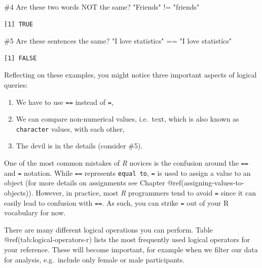 \documentclass[
  letterpaper,
]{krantz}
\makeatletter
\newenvironment{Shaded}{\begin{snugshade}}{\end{snugshade}}
\newcommand{\CommentTok}[1]{\textcolor[rgb]{0.37,0.37,0.37}{#1}}
\newcommand{\SpecialCharTok}[1]{\textcolor[rgb]{0.37,0.37,0.37}{#1}}
\newcommand{\StringTok}[1]{\textcolor[rgb]{0.13,0.47,0.30}{#1}}
\providecommand{\tightlist}{%
  \setlength{\itemsep}{0pt}\setlength{\parskip}{0pt}}\usepackage{longtable,booktabs,array}
\newenvironment{kframe}{%
\medskip{}
\setlength{\fboxsep}{.8em}
 \def\at@end@of@kframe{}%
 \ifinner\ifhmode%
  \def\at@end@of@kframe{\end{minipage}}%
  \begin{minipage}{\columnwidth}%
 \fi\fi%
 \def\FrameCommand##1{\hskip\@totalleftmargin \hskip-\fboxsep
 \colorbox{shadecolor}{##1}\hskip-\fboxsep
     \hskip-\linewidth \hskip-\@totalleftmargin \hskip\columnwidth}%
 \MakeFramed {\advance\hsize-\width
   \@totalleftmargin\z@ \linewidth\hsize
   \@setminipage}}%
 {\par\unskip\endMakeFramed%
 \at@end@of@kframe}
\renewenvironment{Shaded}{\begin{kframe}}{\end{kframe}}
\makeatother
\begin{document}
\begin{Shaded}
\begin{Highlighting}[]
\CommentTok{\#4 Are these two words NOT the same?}
\StringTok{"Friends"} \SpecialCharTok{!=} \StringTok{"friends"}
\end{Highlighting}
\end{Shaded}

\begin{verbatim}
[1] TRUE
\end{verbatim}

\begin{Shaded}
\begin{Highlighting}[]
\CommentTok{\#5 Are these sentences the same?}
\StringTok{"I love statistics"} \SpecialCharTok{==} \StringTok{"I love statistícs"}
\end{Highlighting}
\end{Shaded}

\begin{verbatim}
[1] FALSE
\end{verbatim}

Reflecting on these examples, you might notice three important aspects
of logical queries:

\begin{enumerate}
\def\labelenumi{\arabic{enumi}.}
\tightlist
\item
  We have to use \texttt{==} instead of \texttt{=},
\item
  We can compare non-numerical values, i.e.~text, which is also known as
  \texttt{character} values, with each other,
\item
  The devil is in the details (consider \#5).
\end{enumerate}

One of the most common mistakes of \emph{R} novices is the confusion
around the \texttt{==} and \texttt{=} notation. While \texttt{==}
represents \texttt{equal\ to}, \texttt{=} is used to assign a value to
an object (for more details on assignments see Chapter
@ref(assigning-values-to-objects)). However, in practice, most \emph{R}
programmers tend to avoid \texttt{=} since it can easily lead to
confusion with \texttt{==}. As such, you can strike \texttt{=} out of
your R vocabulary for now.

There are many different logical operations you can perform. Table
@ref(tab:logical-operators-r) lists the most frequently used logical
operators for your reference. These will become important, for example
when we filter our data for analysis, e.g.~include only female or male
participants.
\end{document}
